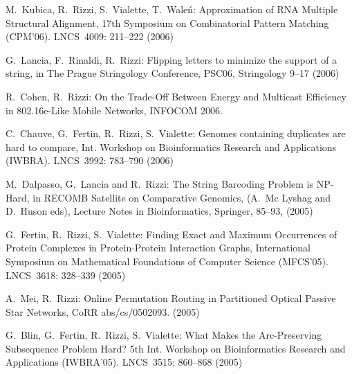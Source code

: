 \begin{etaremune}
\vspace{-1.8mm}
  \item {M.~Kubica, R.~Rizzi, S.~Vialette, T.~Wale\'n:}
   \newblock Approximation of RNA Multiple Structural Alignment,
   \newblock 17th Symposium on Combinatorial Pattern Matching (CPM'06).
   \newblock LNCS~4009: 211--222 (2006)

\vspace{-1.8mm}
  \item {G.~Lancia, F.~Rinaldi, R.~Rizzi:}
   \newblock Flipping letters to minimize the support of a string,
   \newblock in The Prague Stringology Conference, PSC06,
   \newblock Stringology 9--17 (2006)

\vspace{-1.8mm}
  \item {\sc R.~Cohen, R.~Rizzi:}
   \newblock   On the Trade-Off Between Energy and Multicast Efficiency in 802.16e-Like Mobile Networks,
   \newblock INFOCOM 2006.

\vspace{-1.8mm}
  \item {C.~Chauve, G.~Fertin, R.~Rizzi, S.~Vialette:}
   \newblock Genomes containing duplicates are hard to compare,
   \newblock Int. Workshop on Bioinformatics Research and Applications (IWBRA).
   \newblock LNCS~3992: 783--790 (2006)

\vspace{-1.8mm}
  \item {M.~Dalpasso, G.~Lancia and R.~Rizzi:}
   \newblock The String Barcoding Problem is NP-Hard,
   \newblock in RECOMB Satellite on Comparative Genomics, (A.~Mc Lyshag and D.~Huson eds),
   \newblock Lecture Notes in Bioinformatics, Springer, 85--93, (2005) 

\vspace{-1.8mm}
  \item {G.~Fertin, R.~Rizzi, S.~Vialette:}
   \newblock Finding Exact and Maximum Occurrences
of Protein Complexes in Protein-Protein Interaction Graphs,
   \newblock International Symposium on Mathematical Foundations of Computer Science (MFCS'05).
   \newblock LNCS~3618: 328--339 (2005)

\vspace{-1.8mm}
  \item {A.~Mei, R.~Rizzi:}
   \newblock Online Permutation Routing in Partitioned Optical Passive Star Networks,
   \newblock CoRR abs/cs/0502093. (2005)

\vspace{-1.8mm}
  \item {G.~Blin, G.~Fertin, R.~Rizzi, S.~Vialette:}
   \newblock What Makes the Arc-Preserving Subsequence Problem Hard?
   \newblock 5th Int. Workshop on Bioinformatics Research and Applications (IWBRA'05).
   \newblock  LNCS~3515: 860--868 (2005)


\end{etaremune}

